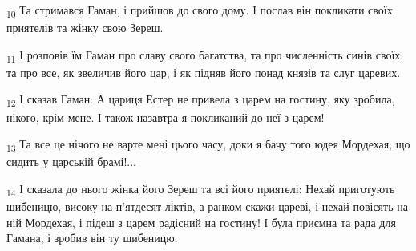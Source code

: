 \begin{tcolorbox}
\textsubscript{10} Та стримався Гаман, і прийшов до свого дому. І послав він покликати своїх приятелів та жінку свою Зереш.
\end{tcolorbox}
\begin{tcolorbox}
\textsubscript{11} І розповів їм Гаман про славу свого багатства, та про численність синів своїх, та про все, як звеличив його цар, і як підняв його понад князів та слуг царевих.
\end{tcolorbox}
\begin{tcolorbox}
\textsubscript{12} І сказав Гаман: А цариця Естер не привела з царем на гостину, яку зробила, нікого, крім мене. І також назавтра я покликаний до неї з царем!
\end{tcolorbox}
\begin{tcolorbox}
\textsubscript{13} Та все це нічого не варте мені цього часу, доки я бачу того юдея Мордехая, що сидить у царській брамі!...
\end{tcolorbox}
\begin{tcolorbox}
\textsubscript{14} І сказала до нього жінка його Зереш та всі його приятелі: Нехай приготують шибеницю, високу на п'ятдесят ліктів, а ранком скажи цареві, і нехай повісять на ній Мордехая, і підеш з царем радісний на гостину! І була приємна та рада для Гамана, і зробив він ту шибеницю.
\end{tcolorbox}

